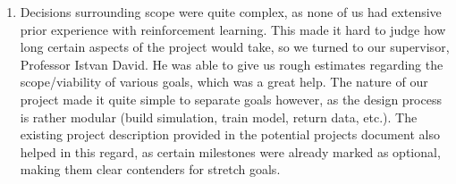 \documentclass{article}
\begin{document}
\begin{enumerate}
    \item
        Decisions surrounding scope were quite complex, as none of us had extensive prior experience with reinforcement learning.
        This made it hard to judge how long certain aspects of the project would take, so we turned to our supervisor, Professor Istvan David.
        He was able to give us rough estimates regarding the scope/viability of various goals, which was a great help.
        The nature of our project made it quite simple to separate goals however, as the design process is rather modular (build simulation, train model, return data, etc.).
        The existing project description provided in the potential projects document also helped in this regard, as certain milestones were already marked as optional, making them clear contenders for stretch goals.
\end{enumerate}
\end{document}
